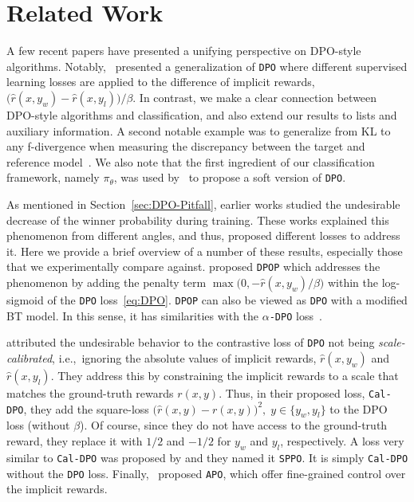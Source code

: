 \section{Related Work}
\label{sec:related-work}

A few recent papers have presented a unifying perspective on DPO-style algorithms. Notably,~\citet{tang2024generalized} presented a generalization of \texttt{DPO} where different supervised learning losses are applied to the difference of implicit rewards, $\big(\hat r(x,y_w) - \hat r(x,y_l)\big)/\beta$.  
In contrast, we make a clear connection between DPO-style algorithms and classification, and also extend our results to lists and auxiliary information. A second notable example was to generalize from KL to any f-divergence when measuring the discrepancy between the target and reference model~\cite{han2024f}. We also note that the first ingredient of our classification framework, namely $\pi_{\theta}$, was used by~\citet{sharifnassab2024soft} to propose a soft version of \texttt{DPO}.

As mentioned in Section~\ref{sec:DPO-Pitfall}, earlier works studied the undesirable decrease of the winner probability during training. These works explained this phenomenon from different angles, and thus, proposed different losses to address it. Here we provide a brief overview of a number of these results, especially those that we experimentally compare against. \citet{smaug} proposed \texttt{DPOP} which addresses the phenomenon by adding the penalty term $\max\big(0,-\hat r(x,y_w)/\beta\big)$ within the log-sigmoid of the \texttt{DPO} loss~\eqref{eq:DPO}. \texttt{DPOP} can also be viewed as \texttt{DPO} with a modified BT model. In this sense, it has similarities with the \texttt{$\alpha$-DPO} loss~\cite{AIPO}.

\citet{xiao2024caldpo} attributed the undesirable behavior to the contrastive loss of \texttt{DPO} not being {\em scale-calibrated}, i.e.,~ignoring the absolute values of implicit rewards, $\hat r(x,y_w)$ and $\hat r(x,y_l)$. They address this by constraining the implicit rewards to a scale that matches the ground-truth rewards $r(x,y)$. Thus, in their proposed loss, \texttt{Cal-DPO}, they add the square-loss $\big(\hat r(x,y) - r(x,y)\big)^2,\;y\in\{y_w,y_l\}$ to the DPO loss (without $\beta$). Of course, since they do not have access to the ground-truth reward, they replace it with $1/2$ and $-1/2$ for $y_w$ and $y_l$, respectively. A loss very similar to \texttt{Cal-DPO} was proposed by \citet{sppo} and they named it \texttt{SPPO}. It is simply \texttt{Cal-DPO} without the \texttt{DPO} loss.  Finally,~\citet{APO} proposed \texttt{APO}, which offer fine-grained control over the implicit rewards.